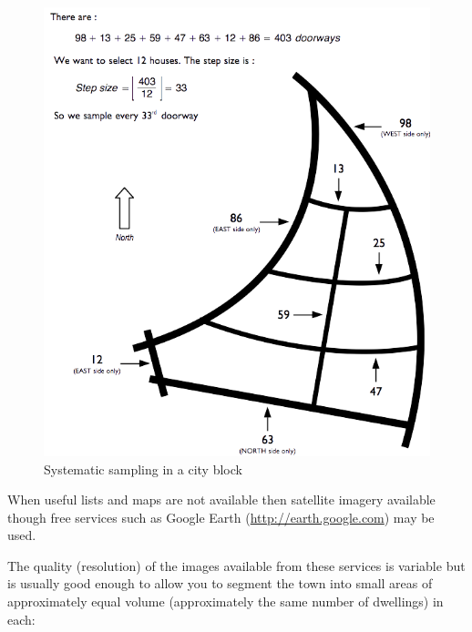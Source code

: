 \documentclass[12pt,a4paper]{book}
\theoremstyle{definition}
\theoremstyle{definition}
\theoremstyle{definition}
\theoremstyle{remark}
\begin{document}
\begin{figure}[H]

{\centering \includegraphics[width=8.38in]{figures/stage2sample13} 

}

\caption{Systematic sampling in a city block}\label{fig:sample27}
\end{figure}

When useful lists and maps are not available then satellite imagery
available though free services such as Google Earth
(\url{http://earth.google.com}) may be used.

The quality (resolution) of the images available from these services is
variable but is usually good enough to allow you to segment the town
into small areas of approximately equal volume (approximately the same
number of dwellings) in each:
\end{document}
